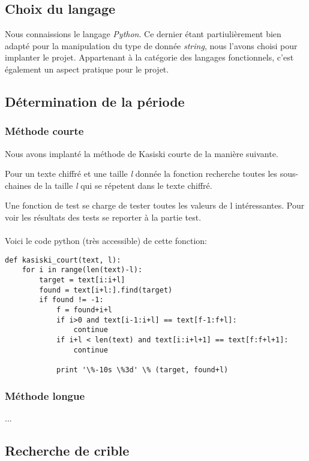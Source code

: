 \documentclass[a4paper, 11pt]{article}
\begin{document}
\subsection{Choix du langage}
Nous connaissions le langage \textit{Python}.
Ce dernier étant partiulièrement bien adapté pour la manipulation
du type de donnée \textit{string}, nous l'avons choisi pour implanter
le projet.
Appartenant à la catégorie des langages fonctionnels, c'est également
un aspect pratique pour le projet.

\subsection{Détermination de la période}

\subsubsection{Méthode courte}
Nous avons implanté la méthode de Kasiski courte de la manière
suivante.

Pour un texte chiffré et une taille \textit{l} donnée la fonction recherche toutes
les sous-chaines de la taille \textit{l} qui se répetent dans le texte
chiffré.

Une fonction de test se charge de tester toutes les valeurs de l
intéressantes.
Pour voir les résultats des tests se reporter à la partie test.

\paragraph{}
Voici le code python (très accessible) de cette fonction:
\newpage
\begin{lstlisting}
def kasiski_court(text, l):
    for i in range(len(text)-l):
        target = text[i:i+l]
        found = text[i+l:].find(target)
        if found != -1:
            f = found+i+l
            if i>0 and text[i-1:i+l] == text[f-1:f+l]:
                continue
            if i+l < len(text) and text[i:i+l+1] == text[f:f+l+1]:
                continue            

            print '\%-10s \%3d' \% (target, found+l)
\end{lstlisting}


\subsubsection{Méthode longue}
... 

\subsection{Recherche de crible}
\end{document}
